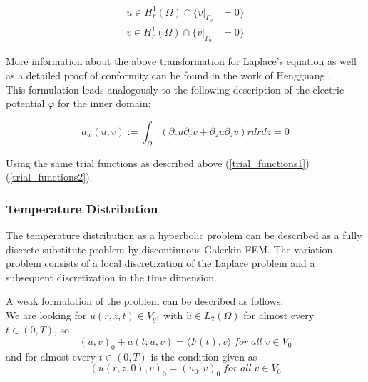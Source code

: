 \documentclass[parskip=half, titlepage=yes, 12pt, BCOR=12mm, DIV=calc]{scrartcl}
\begin{document}
\begin{align}
    u \in H_r^1(\Omega) \cap \{v|_{\Gamma_{0}} &= 0 \} 
    \label{trial_functions1}\\
    v \in H_r^1(\Omega) \cap \{v|_{\Gamma_{0}} &= 0 \}     
    \label{trial_functions2}
\end{align}

More information about the above transformation for Laplace's equation as well as a detailed proof of conformity can be found in the work of Hengguang \cite{hengguang}. \\

This formulation leads analogously to the following description of the electric potential $\varphi$ for the inner domain: 

\begin{equation}
    a_w(u,v) := \int_{\Omega} (\partial_r u \partial_r v + \partial_z u \partial_z v) r drdz = 0 
\end{equation}

Using the same trial functions as described above (\ref{trial_functions1}) (\ref{trial_functions2}).  

\subsubsection{Temperature Distribution}

The temperature distribution as a hyperbolic problem can be described as a fully discrete substitute problem by discontinuous Galerkin FEM. The variation problem consists of a local discretization of the Laplace problem and a subsequent discretization in the time dimension.   

 A weak formulation of the problem can be described as follows: \\

We are looking for $u(r,z,t) \in V_{g1}$ with $\Dot{u} \in L_2(\Omega)$ for almost every $t \in (0,T)$, so \\ \begin{equation}
(\Dot{u},v)_0 + a(t;u,v) = \langle F(t),v \rangle \; for \; all \; v \in V_0    
\end{equation}
and for almost every $t \in (0, T)$ is the condition given as 
\begin{equation}
    (u(r,z,0),v)_0 = (u_0,v)_0 \; for \; all \; v \in V_0
\end{equation}
\end{document}
